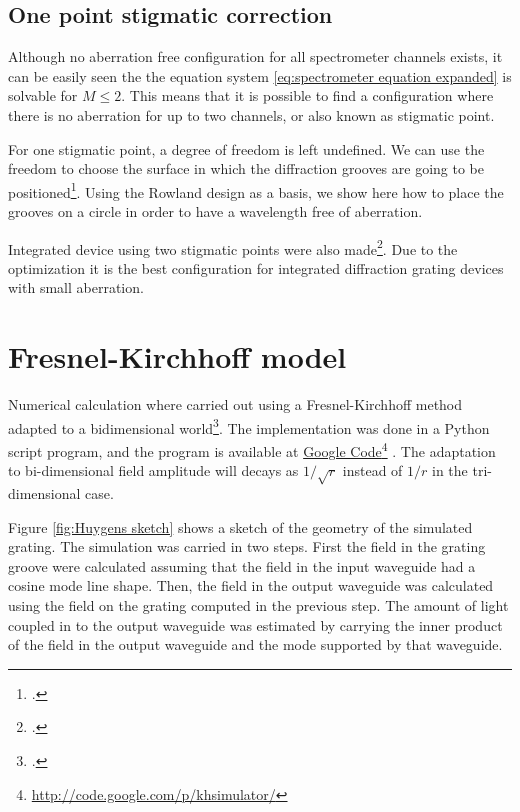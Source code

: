 \documentclass[12pt,twoside,english]{book}
\renewcommand{\~}{\perispomeni}%
\numberwithin{equation}{section}
\numberwithin{figure}{section}
\newcommand\fnurl[2]{%
 \href{#2}{#1}\footnote{\url{#2}}%
}
\begin{document}
\subsection{One point stigmatic correction}
Although no aberration free configuration for all spectrometer channels exists, it can be easily seen the the equation system \ref{eq:spectrometer equation expanded} is solvable for $M\le2$. This means that it is possible to find a configuration where there is no aberration for up to two channels, or also known as stigmatic point.

For one stigmatic point, a degree of freedom is left undefined. We can use the freedom to choose the surface in which the diffraction grooves are going to be positioned\footcite{McGreer:1996p15}. Using the Rowland design as a basis, we show here how to place the grooves on a circle in order to have a wavelength free of aberration. 

Integrated device using two stigmatic points were also made\footcite{Horst:2009p1764,Gidon:1988p1765}. Due to the optimization it is the best configuration for integrated diffraction grating devices with small aberration.


\section{Fresnel-Kirchhoff model}
\label{section:Rayleigh-Huygens-model}

Numerical calculation where carried out using a Fresnel-Kirchhoff method adapted to a bidimensional world\footcite{Brouckaert:2007p82}. The implementation was done in a Python script program, and the program is available at \fnurl{Google Code}{http://code.google.com/p/khsimulator/}. The adaptation to bi-dimensional field amplitude will decays as $1/\sqrt{r}$ instead of $1/r$ in the tri-dimensional case.

Figure \ref{fig:Huygens sketch} shows a sketch of the geometry of the simulated grating. The simulation was carried in two steps. First the field in the grating groove were calculated assuming that the field in the input waveguide had a cosine mode line shape. Then, the field in the output waveguide was calculated using the field on the grating computed in the previous step. The amount of light coupled in to the output waveguide was estimated by carrying the inner product of the field in the output waveguide and the mode supported by that waveguide.
\end{document}
